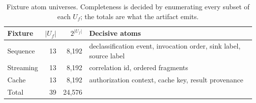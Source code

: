 \begin{table}[t]
  \caption{Fixture atom universes. Completeness is decided by enumerating
  every subset of each $U_f$; the totals are what the artifact emits.}
  \label{tab:universes}
  \centering\scriptsize
  \setlength{\tabcolsep}{3pt}
  \begin{tabular}{@{}>{\raggedright\arraybackslash}p{}rr>{\raggedright\arraybackslash}p{}@{}}
    \toprule
    Fixture & $|U_f|$ & $2^{|U_f|}$ & Decisive atoms \\
    \midrule
    Sequence & 13 & 8,192 & declassification event, invocation order, sink label, source label \\
    Streaming & 13 & 8,192 & correlation id, ordered fragments \\
    Cache & 13 & 8,192 & authorization context, cache key, result provenance \\
    \midrule
    Total & 39 & 24,576 & \\
    \bottomrule
  \end{tabular}
\end{table}
